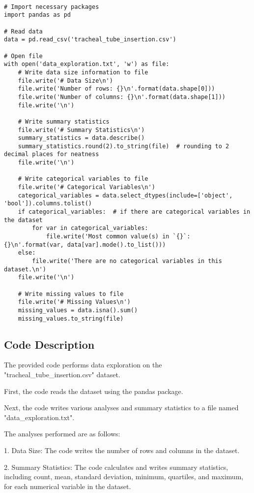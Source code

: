 \documentclass[11pt]{article}
\begin{document}
\begin{verbatim}

# Import necessary packages
import pandas as pd

# Read data
data = pd.read_csv('tracheal_tube_insertion.csv')

# Open file
with open('data_exploration.txt', 'w') as file:
    # Write data size information to file
    file.write('# Data Size\n')
    file.write('Number of rows: {}\n'.format(data.shape[0]))
    file.write('Number of columns: {}\n'.format(data.shape[1]))
    file.write('\n')

    # Write summary statistics
    file.write('# Summary Statistics\n')
    summary_statistics = data.describe()
    summary_statistics.round(2).to_string(file)  # rounding to 2 decimal places for neatness
    file.write('\n')

    # Write categorical variables to file
    file.write('# Categorical Variables\n')
    categorical_variables = data.select_dtypes(include=['object', 'bool']).columns.tolist()
    if categorical_variables:  # if there are categorical variables in the dataset
        for var in categorical_variables:
            file.write('Most common value(s) in `{}`: {}\n'.format(var, data[var].mode().to_list()))
    else:
        file.write('There are no categorical variables in this dataset.\n')
    file.write('\n')

    # Write missing values to file
    file.write('# Missing Values\n')
    missing_values = data.isna().sum()
    missing_values.to_string(file)

\end{verbatim}

\subsection{Code Description}

The provided code performs data exploration on the "tracheal\_tube\_insertion.csv" dataset. 

First, the code reads the dataset using the pandas package. 

Next, the code writes various analyses and summary statistics to a file named "data\_exploration.txt".

The analyses performed are as follows:

1. Data Size: The code writes the number of rows and columns in the dataset.

2. Summary Statistics: The code calculates and writes summary statistics, including count, mean, standard deviation,
   minimum, quartiles, and maximum, for each numerical variable in the dataset. 
\end{document}
